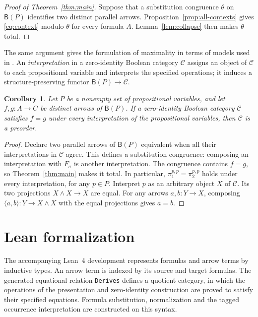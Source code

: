 \documentclass[11pt]{article}
\newtheorem{corollary}[theorem]{Corollary}
\newcommand{\B}{\mathsf B}
\begin{document}
\begin{proof}[Proof of Theorem~\ref{thm:main}]
Suppose that a substitution congruence $\theta$ on $\B(P)$ identifies
two distinct parallel arrows. Proposition~\ref{prop:all-contexts}
gives \eqref{eq:context} modulo $\theta$ for every formula $A$.
Lemma~\ref{lem:collapse} then makes $\theta$ total.
\end{proof}

The same argument gives the formulation of maximality in terms of
models used in \cite[\S9.3, p.~194]{DP}. An \emph{interpretation} in
a zero-identity Boolean category $\mathcal C$ assigns an object of
$\mathcal C$ to each propositional variable and interprets the
specified operations; it induces a structure-preserving functor
$\B(P)\to\mathcal C$.

\begin{corollary}\label{cor:models}
Let $P$ be a nonempty set of propositional variables, and let
$f,g:A\to C$ be distinct arrows of $\B(P)$.
If a zero-identity Boolean category $\mathcal C$ satisfies $f=g$
under every interpretation of the propositional variables, then
$\mathcal C$ is a preorder.
\end{corollary}

\begin{proof}
Declare two parallel arrows of $\B(P)$ equivalent when all their
interpretations in $\mathcal C$ agree. This defines a substitution
congruence: composing an interpretation with $F_\sigma$ is another
interpretation. The congruence contains $f=g$, so
Theorem~\ref{thm:main} makes it total. In particular,
$\pi_1^{p,p}=\pi_2^{p,p}$ holds under every interpretation, for any
$p\in P$. Interpret $p$ as an arbitrary object $X$ of $\mathcal C$.
Its two projections $X\wedge X\to X$ are equal. For any arrows $a,b:Y\to X$, composing
$\langle a,b\rangle:Y\to X\wedge X$ with the equal projections gives $a=b$.
\end{proof}

\section{Lean formalization}\label{sec:formalization}

The accompanying Lean~4 development \cite{Formalization} represents
formulas and arrow terms by inductive types. An arrow term is indexed
by its source and target formulas. The generated equational relation
\texttt{Derives} defines a quotient category, in which the operations of
the presentation and zero-identity construction are proved to satisfy their
specified equations. Formula substitution, normalization and the tagged
occurrence interpretation are constructed on this syntax.
\end{document}
